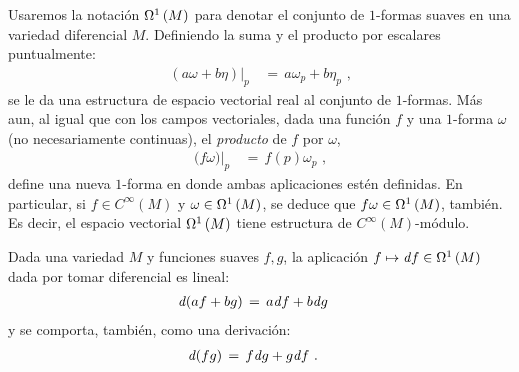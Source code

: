 Usaremos la notaci\'{o}n $\formes[1]{M}$ para denotar el conjunto de
$1$-formas suaves en una variedad diferencial $M$. Definiendo la suma y el
producto por escalares puntualmente:
\begin{align*}
	(a\omega+b\eta)|_{p} & \,=\,a\omega_{p}+b\eta_{p}
	\text{ ,}
\end{align*}
%
se le da una estructura de espacio vectorial real al conjunto de $1$-formas.
M\'{a}s aun, al igual que con los campos vectoriales, dada una
funci\'{o}n $f$ y una $1$-forma $\omega$ (no necesariamente continuas),
el \emph{producto} de $f$ por $\omega$,
\begin{align*}
	\big(f\omega\big)|_{p} & \,=\,f(p)\omega_{p}
	\text{ ,}
\end{align*}
%
define una nueva $1$-forma en donde ambas aplicaciones est\'{e}n definidas.
En particular, si $f\in C^{\infty}(M)$ y $\omega\in\formes[1]{M}$, se
deduce que $f\omega\in\formes[1]{M}$, tambi\'{e}n. Es decir, el espacio
vectorial $\formes[1]{M}$ tiene estructura de $C^{\infty}(M)$-m\'{o}dulo.

\begin{obsDiferencialDerivacion}\label{obs:diferencialderivacion}
	Dada una variedad $M$ y funciones suaves $f,g$, la aplicaci\'{o}n
	$f\mapsto\derext{f}\in\formes[1]{M}$ dada por tomar diferencial
	es lineal:
	\begin{align*}
		\derext{(af+bg)} & \,=\,a\derext{f}+b\derext{g}
	\end{align*}
	y se comporta, tambi\'{e}n, como una derivaci\'{o}n:
	\begin{align*}
		\derext{(fg)} & \,=\,f\derext{g} + g\derext{f}
		\text{ .}
	\end{align*}
\end{obsDiferencialDerivacion}

